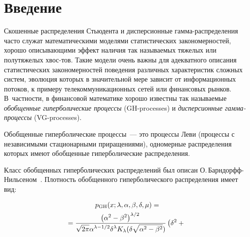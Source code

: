       \begin{multicols}{2}
      
            \label{st\stat}

\section{Введение}

Скошенные распределения Стьюдента и дисперсионные
гам\-ма-рас\-пре\-де\-ле\-ния часто служат математическими моделями
статистических закономерностей, хорошо описывающими эффект наличия\linebreak
так называемых тяжелых или полутяжелых хвос-\linebreak тов. Такие модели очень
важны для адекватного описания статистических закономерностей
поведения различных характеристик сложных сис\-тем, эволюция которых
в значительной мере зависит от информационных потоков, к примеру
телекоммуникационных сетей или финансовых рынков. В~част\-ности, в
финансовой математике хорошо известны так называемые 
\textit{обобщенные гиперболические процессы} (GH-processes) и \textit{дисперсионные 
гам\-ма-про\-цес\-сы} (VG-processes).

Обобщенные гиперболические процессы~--- это процессы Леви (процессы
с независимыми ста\-ци\-о\-нар\-ны\-ми приращениями), одномерные
распределения которых имеют обобщенные гиперболические
распределения. 

Класс обобщенных гиперболических распределений был
описан О.\,Барн\-дорфф-Ниль\-се\-ном~\cite{BarndorffNielsen1977}.
Плотность обобщенного гиперболического распределения имеет вид:

\noindent
\begin{multline*}
 p_{\mathrm{GH}}(x;\lambda,\alpha,\beta,\delta,\mu) ={}\\
 {}=
\displaystyle\frac{\displaystyle \left(\alpha^2-\beta^2\right)^{\lambda/2}\mathstrut}{\displaystyle \sqrt{2\pi}\alpha^{\lambda-1/2}\delta^{\lambda}
  K_{\lambda}(\delta\sqrt{\alpha^2-\beta^2})\mathstrut}
 \left(\delta^2+{}\right.\hspace*{2mm}
 \end{multline*}
 

\end{multicols}
